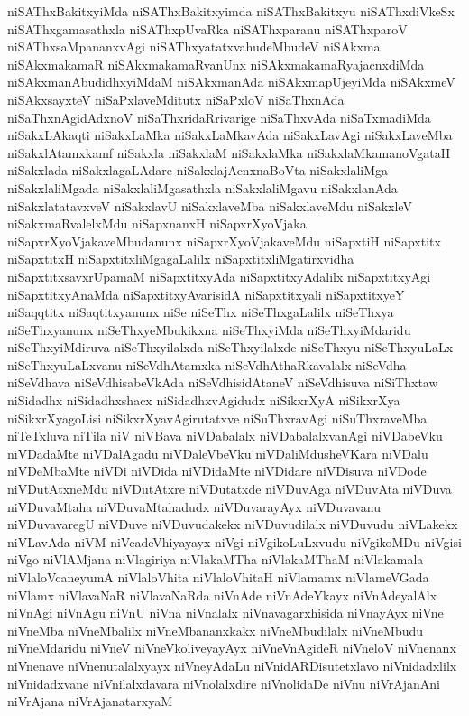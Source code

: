 {niSAThxBakitxyiMda
niSAThxBakitxyimda
niSAThxBakitxyu
niSAThxdiVkeSx
niSAThxgamasathxla
niSAThxpUvaRka
niSAThxparanu
niSAThxparoV
niSAThxsaMpananxvAgi
niSAThxyatatxvahudeMbudeV
niSAkxma
niSAkxmakamaR
niSAkxmakamaRvanUnx
niSAkxmakamaRyajacnxdiMda
niSAkxmanAbudidhxyiMdaM
niSAkxmanAda
niSAkxmapUjeyiMda
niSAkxmeV
niSAkxsayxteV
niSaPxlaveMditutx
niSaPxloV
niSaThxnAda
niSaThxnAgidAdxnoV
niSaThxridaRrivarige
niSaThxvAda
niSaTxmadiMda
niSakxLAkaqti
niSakxLaMka
niSakxLaMkavAda
niSakxLavAgi
niSakxLaveMba
niSakxlAtamxkamf
niSakxla
niSakxlaM
niSakxlaMka
niSakxlaMkamanoVgataH
niSakxlada
niSakxlagaLAdare
niSakxlajAcnxnaBoVta
niSakxlaliMga
niSakxlaliMgada
niSakxlaliMgasathxla
niSakxlaliMgavu
niSakxlanAda
niSakxlatatavxveV
niSakxlavU
niSakxlaveMba
niSakxlaveMdu
niSakxleV
niSakxmaRvalelxMdu
niSapxnanxH
niSapxrXyoVjaka
niSapxrXyoVjakaveMbudanunx
niSapxrXyoVjakaveMdu
niSapxtiH
niSapxtitx
niSapxtitxH
niSapxtitxliMgagaLalilx
niSapxtitxliMgatirxvidha
niSapxtitxsavxrUpamaM
niSapxtitxyAda
niSapxtitxyAdalilx
niSapxtitxyAgi
niSapxtitxyAnaMda
niSapxtitxyAvarisidA
niSapxtitxyali
niSapxtitxyeY
niSaqqtitx
niSaqtitxyanunx
niSe
niSeThx
niSeThxgaLalilx
niSeThxya
niSeThxyanunx
niSeThxyeMbukikxna
niSeThxyiMda
niSeThxyiMdaridu
niSeThxyiMdiruva
niSeThxyilalxda
niSeThxyilalxde
niSeThxyu
niSeThxyuLaLx
niSeThxyuLaLxvanu
niSeVdhAtamxka
niSeVdhAthaRkavalalx
niSeVdha
niSeVdhava
niSeVdhisabeVkAda
niSeVdhisidAtaneV
niSeVdhisuva
niSiThxtaw
niSidadhx
niSidadhxshacx
niSidadhxvAgidudx
niSikxrXyA
niSikxrXya
niSikxrXyagoLisi
niSikxrXyavAgirutatxve
niSuThxravAgi
niSuThxraveMba
niTeTxluva
niTila
niV
niVBava
niVDabalalx
niVDabalalxvanAgi
niVDabeVku
niVDadaMte
niVDalAgadu
niVDaleVbeVku
niVDaliMdusheVKara
niVDalu
niVDeMbaMte
niVDi
niVDida
niVDidaMte
niVDidare
niVDisuva
niVDode
niVDutAtxneMdu
niVDutAtxre
niVDutatxde
niVDuvAga
niVDuvAta
niVDuva
niVDuvaMtaha
niVDuvaMtahadudx
niVDuvarayAyx
niVDuvavanu
niVDuvavaregU
niVDuve
niVDuvudakekx
niVDuvudilalx
niVDuvudu
niVLakekx
niVLavAda
niVM
niVcadeVhiyayayx
niVgi
niVgikoLuLxvudu
niVgikoMDu
niVgisi
niVgo
niVlAMjana
niVlagiriya
niVlakaMTha
niVlakaMThaM
niVlakamala
niVlaloVcaneyumA
niVlaloVhita
niVlaloVhitaH
niVlamamx
niVlameVGada
niVlamx
niVlavaNaR
niVlavaNaRda
niVnAde
niVnAdeYkayx
niVnAdeyalAlx
niVnAgi
niVnAgu
niVnU
niVna
niVnalalx
niVnavagarxhisida
niVnayAyx
niVne
niVneMba
niVneMbalilx
niVneMbananxkakx
niVneMbudilalx
niVneMbudu
niVneMdaridu
niVneV
niVneVkoliveyayAyx
niVneVnAgideR
niVneloV
niVnenanx
niVnenave
niVnenutalalxyayx
niVneyAdaLu
niVnidARDisutetxlavo
niVnidadxlilx
niVnidadxvane
niVnilalxdavara
niVnolalxdire
niVnolidaDe
niVnu
niVrAjanAni
niVrAjana
niVrAjanatarxyaM
}
